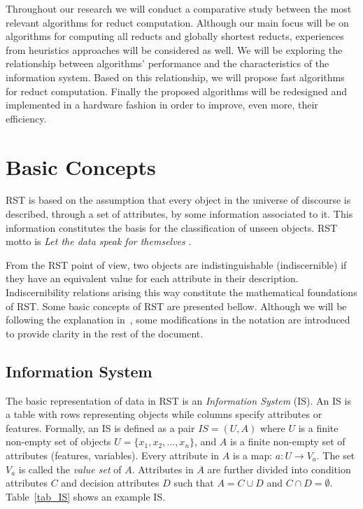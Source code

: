 \documentclass[authoryear,11pt]{elsarticle}
\begin{document}
  Throughout our research we will conduct a comparative study between the most relevant algorithms for reduct 
  computation. Although our main focus will be on algorithms for computing all reducts and globally shortest
  reducts, experiences from heuristics approaches will be considered as well. We will be exploring the relationship 
  between algorithms' performance and the characteristics of the information system. Based on this relationship,
  we will propose fast algorithms for reduct computation. Finally the proposed algorithms 
  will be redesigned and implemented in a hardware fashion in order to improve, even more, their efficiency.  

\section{Basic Concepts}\label{basicConcepts}
  RST is based on the assumption that every object in the universe of discourse is described, through a 
  set of attributes, by some information associated to it. This information constitutes the basis for the
  classification of unseen objects. RST motto is \textit{Let the data speak for themselves} \citep{Tiwari14}.
  
  From the RST point of view, two objects are indistinguishable (indiscernible) if they have an equivalent 
  value for each attribute in their description. Indiscernibility relations arising this way constitute the
  mathematical foundations of RST. 
  Some basic concepts of RST are presented bellow. Although we will be following the explanation 
  in~\citep{Polkowski00}, some modifications in the notation are introduced to provide clarity in the rest 
  of the document.
  
\subsection{Information System}
  The basic representation of data in RST is an \emph{Information System} (IS). An IS is a table with rows
  representing objects while columns specify attributes or features. Formally, an IS is defined as a pair
  $IS=(U,A)$ where $U$ is a finite non-empty set of objects $U=\lbrace x_1,x_2,...,x_n\rbrace$, and $A$ is a 
  finite non-empty set
  of attributes (features, variables). Every attribute in $A$ is a map: $a: U \rightarrow V_a$. The set $V_a$ is
  called the \textit{value set} of $A$. Attributes in $A$ are further divided into condition attributes $C$ and 
  decision attributes $D$ such that $A=C \cup D$ and $C \cap D =\emptyset$. 
  Table~\ref{tab_IS} shows an example IS.
  
\end{document}
